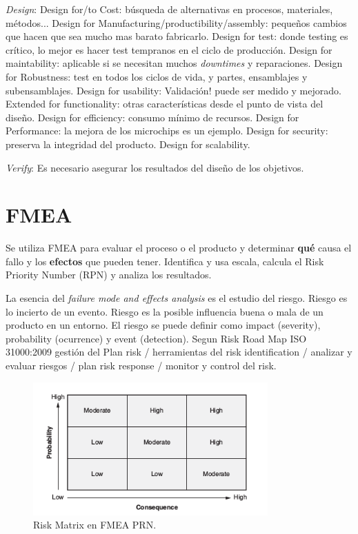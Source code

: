 \documentclass[oneside]{book}
\begin{document}
\textit{Design}: \newline Design for/to Cost: búsqueda de alternativas en procesos, materiales, métodos... \newline Design for Manufacturing/productibility/assembly: pequeños cambios que hacen que sea mucho mas barato fabricarlo. \newline Design for test: donde testing es crítico, lo mejor es hacer test tempranos en el ciclo de producción. \newline Design for maintability: aplicable si se necesitan muchos \textit{downtimes} y reparaciones. \newline Design for Robustness: test en todos los ciclos de vida, y partes, ensamblajes y subensamblajes. \newline Design for usability: Validación! puede ser medido y mejorado. Extended for functionality: otras características desde el punto de vista del diseño. \newline Design for efficiency: consumo mínimo de recursos. \newline Design for Performance: la mejora de los microchips es un ejemplo. \newline Design for security: preserva la integridad del producto. Design for scalability.

\textit{Verify}: Es necesario asegurar los resultados del diseño de los objetivos. 

\section{FMEA} Se utiliza FMEA para evaluar el proceso o el producto y determinar \textbf{qué} causa el fallo y los \textbf{efectos} que pueden tener. 
Identifica y usa escala, calcula el Risk Priority Number (RPN) y analiza los resultados.

La esencia del \textit{failure mode and effects analysis} es el estudio del riesgo. Riesgo es lo incierto de un evento. Riesgo es la posible influencia buena o mala de un producto en un entorno. El riesgo se puede definir como impact (severity), probability (ocurrence) y event (detection). Segun Risk Road Map ISO 31000:2009 gestión del Plan risk / herramientas del risk identification / analizar y evaluar riesgos / plan risk response / monitor y control del risk.

\begin{figure}[ht!]
	\centering
	\includegraphics[width=90mm]{imagenes/RiskMatrix.png}
	\caption{Risk Matrix en FMEA PRN.}
	\label{fig:kMatrix}
\end{figure}
\end{document}
